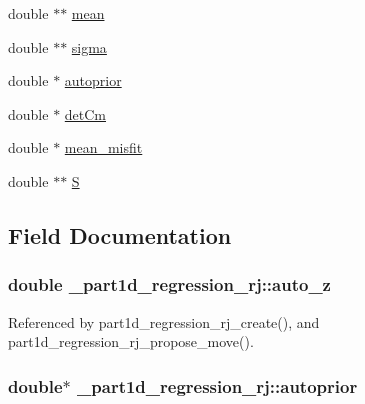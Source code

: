 \begin{DoxyCompactItemize}
\item 
double $\ast$$\ast$ \hyperlink{struct__part1d__regression__rj_ac7cbfad00ca6261ec35e0605f27e57b0}{mean}
\item 
double $\ast$$\ast$ \hyperlink{struct__part1d__regression__rj_ac8e269e5f35a939eff981f59a5c00724}{sigma}
\item 
double $\ast$ \hyperlink{struct__part1d__regression__rj_a1d22966d4c7293b3375cdf212e9fe9e2}{autoprior}
\item 
double $\ast$ \hyperlink{struct__part1d__regression__rj_a4931ff9d62c334cc4ecf35ebffbf7950}{det\+Cm}
\item 
double $\ast$ \hyperlink{struct__part1d__regression__rj_a3511cbc88f0c8217f1c82df7d9727f0e}{mean\+\_\+misfit}
\item 
double $\ast$$\ast$ \hyperlink{struct__part1d__regression__rj_aa8816e62847a9287c933a7f481eaa256}{S}
\end{DoxyCompactItemize}


\subsection{Field Documentation}
\subsubsection[{\texorpdfstring{auto\+\_\+z}{auto_z}}]{\setlength{\rightskip}{0pt plus 5cm}double \+\_\+part1d\+\_\+regression\+\_\+rj\+::auto\+\_\+z}\hypertarget{struct__part1d__regression__rj_a34e609ee44d89b4045c9ffc955963be4}{}\label{struct__part1d__regression__rj_a34e609ee44d89b4045c9ffc955963be4}


Referenced by part1d\+\_\+regression\+\_\+rj\+\_\+create(), and part1d\+\_\+regression\+\_\+rj\+\_\+propose\+\_\+move().

\subsubsection[{\texorpdfstring{autoprior}{autoprior}}]{\setlength{\rightskip}{0pt plus 5cm}double$\ast$ \+\_\+part1d\+\_\+regression\+\_\+rj\+::autoprior}\hypertarget{struct__part1d__regression__rj_a1d22966d4c7293b3375cdf212e9fe9e2}{}\label{struct__part1d__regression__rj_a1d22966d4c7293b3375cdf212e9fe9e2}


